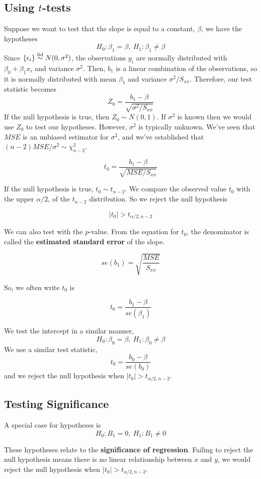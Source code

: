 \subsection{Using $t$-tests}

Suppose we want to test that the slope is equal to a constant, $\beta$, we have the hypotheses 
\[H_0: \beta_1 = \beta, \ H_1: \beta_1 \neq \beta\]
Since $\{\epsilon_i\} \overset{\mathrm{iid}}{\sim} N(0,\sigma^2)$, the observations $y_i$ are normally distributed with $\beta_0  + \beta_1x_i$ and variance $\sigma^2$. Then, $b_1$ is a linear combination of the observations, so it is normally distributed with mean $\beta_1$ and variance $\sigma^2/S_{xx}$. Therefore, our test statistic becomes 
\[Z_0 = \frac{b_1 - \beta}{\sqrt{\sigma^2/S_{xx}}}\]
If the null hypothesis is true, then $Z_0 \sim N(0,1)$. If $\sigma^2$ is known then we would use $Z_0$ to test our hypotheses. However, $\sigma^2$ is typically unknown. We've seen that $MSE$ is an unbiased estimator for $\sigma^2$, and we've established that $(n-2)MSE/\sigma^2 \sim \chi_{n-2}^2$.

\[t_0 = \frac{b_1 - \beta}{\sqrt{MSE/S_{xx}}}\]

If the null hypothesis is true, $t_0 \sim t_{n-2}$. We compare the observed value $t_0$ with the upper $\alpha/2$, of the $t_{n-2}$ distribution. So we reject the null hypothesis

\[|t_0| > t_{\alpha/2,n-2}\]

We can also test with the $p$-value. From the equation for $t_0$, the denominator is called the \textbf{estimated standard error} of the slope.  

\[se(b_1) = \sqrt{\frac{MSE}{S_{xx}}}\]

So, we often write $t_0$ is 

\[t_0 = \frac{b_1 - \beta}{se(\beta_1)}\]

We test the intercept in a similar manner, 
\[H_0: \beta_0 = \beta, \ H_1: \beta_0 \neq \beta\]
We use a similar test statistic,
\[t_0 = \frac{b_0 - \beta}{se(b_0)}\]
and we reject the null hypothesis when $|t_0| > t_{\alpha/2, n-2}$.

\subsection{Testing Significance}

A special case for hypotheses is 
\[H_0: B_1 = 0, \ H_1: B_1 \neq 0\]

These hypotheses relate to the \textbf{significance of regression}. Failing to reject the null hypothesis means there is no linear relationship between $x$ and $y$, we would reject the null hypothesis when $|t_0| > t_{\alpha/2, n-2}$. 

